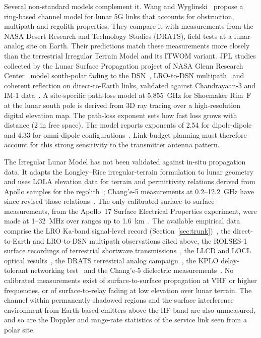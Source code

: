 \documentclass{IEEEoj}
\begin{document}
Several non-standard models complement it. Wang and Wyglinski~\cite{wang_ojcoms2025} propose a ring-based channel model for lunar 5G links that accounts for obstruction, multipath and regolith properties. They compare it with measurements from the NASA Desert Research and Technology Studies (DRATS), field tests at a lunar-analog site on Earth. Their predictions match these measurements more closely than the terrestrial Irregular Terrain Model and its ITWOM variant. JPL studies collected by the Lunar Surface Propagation project of NASA Glenn Research Center~\cite{nasa_grc_lsp_2026} model south-polar fading to the DSN~\cite{margot_southpole_fading}, LRO-to-DSN multipath~\cite{sanchez_net_multipath_2020} and coherent reflection on direct-to-Earth links, validated against Chandrayaan-3 and IM-1 data~\cite{sanchez_net_coherent_2025}. A site-specific path-loss model at \SI{5.855}{GHz} for Shoemaker Rim~F at the lunar south pole is derived from 3D ray tracing over a high-resolution digital elevation map. The path-loss exponent sets how fast loss grows with distance (2 in free space). The model reports exponents of 2.54 for dipole-dipole and 4.33 for omni-dipole configurations~\cite{shoemaker_rim_2026}. Link-budget planning must therefore account for this strong sensitivity to the transmitter antenna pattern.

The Irregular Lunar Model has not been validated against in-situ propagation data. It adapts the Longley--Rice irregular-terrain formulation to lunar geometry and uses LOLA elevation data for terrain and permittivity relations derived from Apollo samples for the regolith~\cite{itu_p2170,ntia_ilm_github,olhoeft_strangway1975}; Chang'e-5 measurements at 0.2--12.2~GHz have since revised those relations~\cite{dong_dielectric_ce5}. The only calibrated surface-to-surface measurements, from the Apollo~17 Surface Electrical Properties experiment, were made at 1--32~MHz over ranges up to \SI{1.6}{km}~\cite{grimm_sep2018}. The available empirical data comprise the LRO Ka-band signal-level record (Section~\ref{sec:trunk})~\cite{lro_ka_analysis}, the direct-to-Earth and LRO-to-DSN multipath observations cited above, the ROLSES-1 surface recordings of terrestrial shortwave transmissions~\cite{hibbard_rolses2025}, the LLCD and LOCL optical results~\cite{boroson_llcd,giggenbach_locl}, the DRATS terrestrial analog campaign~\cite{nasa_drats2022}, the KPLO delay-tolerant networking test~\cite{kim_kplo_dtn} and the Chang'e-5 dielectric measurements~\cite{dong_dielectric_ce5}. No calibrated measurements exist of surface-to-surface propagation at VHF or higher frequencies, or of surface-to-relay fading at low elevation over lunar terrain. The channel within permanently shadowed regions and the surface interference environment from Earth-based emitters above the HF band are also unmeasured, and so are the Doppler and range-rate statistics of the service link seen from a polar site.
\end{document}
